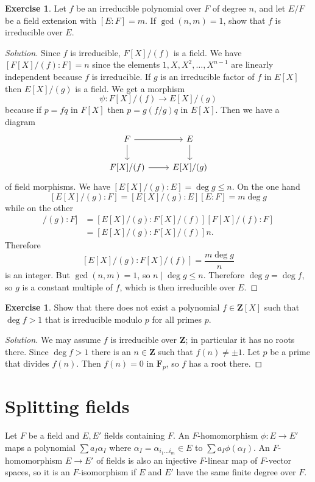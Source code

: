 \documentclass[11pt]{amsart}
\theoremstyle{definition}
\newtheorem{e}[theo]{Exercise}
\newenvironment{s}{\begin{proof}[Solution]}{\end{proof}}
\def\FF{\mathbf{F}}
\def\ZZ{\mathbf{Z}}
\begin{document}
\begin{e}
Let $f$ be an irreducible polynomial over $F$ of degree $n$, and let $E/F$ be a field extension with $[E:F] = m$.
If $\gcd(n,m) = 1$, show that $f$ is irreducible over $E$.
\end{e}

\begin{s}
Since $f$ is irreducible, $F[X]/(f)$ is a field.
We have $[F[X]/(f) : F] = n$ since the elements $1, X, X^2, \ldots, X^{n-1}$ are linearly independent because $f$ is irreducible.
If $g$ is an irreducible factor of $f$ in $E[X]$ then $E[X]/(g)$ is a field.
We get a morphism
\[
\psi : F[X] / (f) \to E[X] / (g)
\]
because if $p = fq$ in $F[X]$ then $p = g (f/g) q$ in $E[X]$.
Then we have a diagram
\[
\begin{tikzcd}
F \ar[r] \ar[d] &
E \ar[d] \\
F[X]/(f) \ar[r] &
E[X]/(g)
\end{tikzcd}
\]
of field morphisms.
We have $[E[X]/(g) : E] = \deg g \leq n$.
On the one hand
\[
[E[X]/(g):F]
= [E[X]/(g):E] [E:F]
= m \deg g
\]
while on the other
\begin{align*}
[E[X]/(g):F]
&= [E[X]/(g) : F[X]/(f)] [F[X]/(f) : F]
\\
&= [E[X]/(g) : F[X]/(f)] n.
\end{align*}
Therefore
\[
[E[X]/(g) : F[X]/(f)]
= \frac{m \deg g}{n}
\]
is an integer.
But $\gcd(n,m) = 1$, so $n \mid \deg g \leq n$. 
Therefore $\deg g = \deg f$, so $g$ is a constant multiple of $f$, which is then irreducible over $E$.
\end{s}


\begin{e}
Show that there does not exist a polynomial $f \in \ZZ[X]$ such that $\deg f > 1$ that is irreducible modulo $p$ for all primes $p$.
\end{e}

\begin{s}
We may assume $f$ is irreducible over $\ZZ$; in particular it has no roots there.
Since $\deg f > 1$ there is an $n \in \ZZ$ such that $f(n) \not= \pm1$.
Let $p$ be a prime that divides $f(n)$.
Then $f(n) = 0$ in $\FF_p$, so $f$ has a root there.
\end{s}


\section{Splitting fields}


Let $F$ be a field and $E,E'$ fields containing $F$.
An $F$-homomorphism $\phi : E \to E'$ maps a polynomial $\sum a_{I} \alpha_I$ where $\alpha_I = \alpha_{i_1 \ldots i_m} \in E$ to $\sum a_I \phi(\alpha_I)$.
An $F$-homomorphism $E \to E'$ of fields is also an injective $F$-linear map of $F$-vector spaces, so it is an $F$-isomorphism if $E$ and $E'$ have the same finite degree over $F$.
\end{document}
